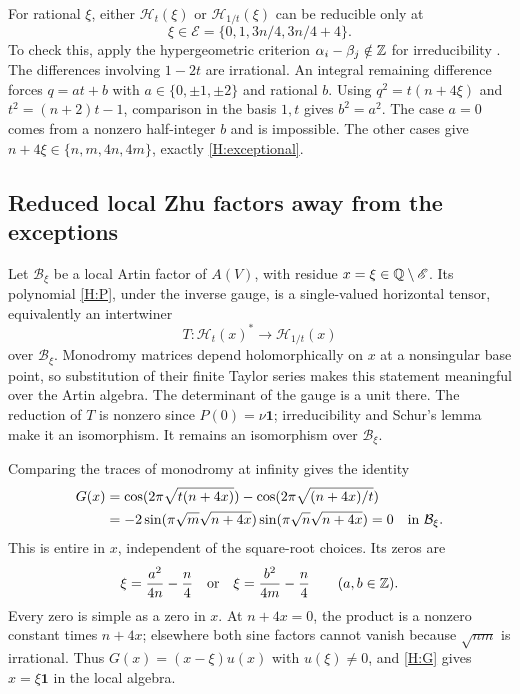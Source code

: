 \documentclass[11pt]{article}
\newcommand{\one}{\mathbf1}\newcommand{\D}{\mathcal D}\newcommand{\Dcat}{\mathcal D}
\numberwithin{equation}{section}
\begin{document}
For rational $\xi$, either $\mathcal H_t(\xi)$ or $\mathcal H_{1/t}(\xi)$ can be reducible only at
\begin{equation}\label{H:exceptional}
\xi\in\mathscr E=\{0,1,3n/4,3n/4+4\}.
\end{equation}
To check this, apply the hypergeometric criterion $\alpha_i-\beta_j\notin\mathbb Z$ for irreducibility \cite[Propositions~3.2--3.3]{H:BH}. The differences involving $1-2t$ are irrational. An integral remaining difference forces $q=at+b$ with $a\in\{0,\pm1,\pm2\}$ and rational $b$. Using $q^2=t(n+4\xi)$ and $t^2=(n+2)t-1$, comparison in the basis $1,t$ gives $b^2=a^2$. The case $a=0$ comes from a nonzero half-integer $b$ and is impossible. The other cases give $n+4\xi\in\{n,m,4n,4m\}$, exactly \eqref{H:exceptional}.

\subsection{Reduced local Zhu factors away from the exceptions}
Let $\mathcal B_\xi$ be a local Artin factor of $A(V)$, with residue $x=\xi\in\mathbb Q\setminus\mathscr E$. Its polynomial \eqref{H:P}, under the inverse gauge, is a single-valued horizontal tensor, equivalently an intertwiner
\[
T:\mathcal H_t(x)^*\longrightarrow\mathcal H_{1/t}(x)
\]
over $\mathcal B_\xi$. Monodromy matrices depend holomorphically on $x$ at a nonsingular base point, so substitution of their finite Taylor series makes this statement meaningful over the Artin algebra. The determinant of the gauge is a unit there. The reduction of $T$ is nonzero since $P(0)=\nu\one$; irreducibility and Schur's lemma make it an isomorphism. It remains an isomorphism over $\mathcal B_\xi$.

Comparing the traces of monodromy at infinity gives the identity
\begin{align}
G(x)&=\cos(2\pi\sqrt{t(n+4x)})
-\cos(2\pi\sqrt{(n+4x)/t})\notag\\
&=-2\sin(\pi\sqrt m\sqrt{n+4x})
\sin(\pi\sqrt n\sqrt{n+4x})=0\quad\text{in }\mathcal B_\xi.\label{H:G}
\end{align}
This is entire in $x$, independent of the square-root choices. Its zeros are
\[
\xi=\frac{a^2}{4n}-\frac n4\quad\text{or}\quad
\xi=\frac{b^2}{4m}-\frac n4\qquad(a,b\in\mathbb Z).
\]
Every zero is simple as a zero in $x$. At $n+4x=0$, the product is a nonzero constant times $n+4x$; elsewhere both sine factors cannot vanish because $\sqrt{nm}$ is irrational. Thus $G(x)=(x-\xi)u(x)$ with $u(\xi)\ne0$, and \eqref{H:G} gives $x=\xi\one$ in the local algebra.
\end{document}
